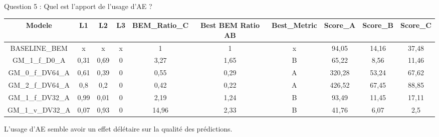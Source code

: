 \documentclass[
11pt,notheorems,hyperref={pdfauthor=whatever}
]{beamer}
\begin{document}
\begin{frame}{Question 5 : Quel est l’apport de l’usage d’AE ?}
    \begin{center}
        \tiny
        \begin{tabular}{|c|c|c|c|c|c|c|c|c|c|}
                \hline
                Modele & L1 & L2 & L3 & BEM\_Ratio\_C & Best BEM Ratio AB & Best\_Metric & Score\_A & Score\_B & Score\_C   \\
                \hline
                BASELINE\_BEM           & x     & x      & x    &  1   & 1     & x    & 94,05  & 14,16 & 37,48      \\
                GM\_1\_f\_D0\_A         & 0,31  & 0,69   & 0    &3,27  & 1,65  & B    & 65,22  & 8,56  & 11,46      \\     
                GM\_0\_f\_DV64\_A       & 0,61	&0,39	 & 0    & 0,55 &0,29   & A    &320,28  &53,24  &67,62       \\
                GM\_2\_f\_DV64\_A       & 0,8	&0,2	 & 0    &0,42  &0,22   & A    &426,52  &67,45  &88,85       \\
                GM\_1\_f\_DV32\_A       &0,99	&0,01	 & 0    &2,19  &1,24   & B    &93,49   &11,45  &17,11       \\                
                GM\_1\_v\_DV32\_A       &0,07	&0,93	 & 0    &14,96 &2,33   & B    &41,76   &6,07   &2,5         \\
                \hline
        \end{tabular}
    \end{center}

    \vspace{0.3cm}
    
    L'usage d'AE semble avoir un effet délétaire sur la qualité des prédictions.
\end{frame}
\end{document}
